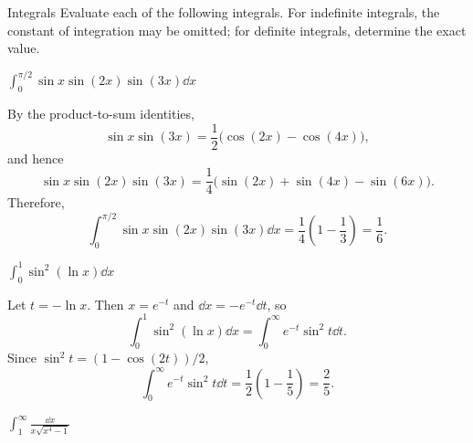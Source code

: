     \begin{expectedproblemgroup}{Integrals}
        Evaluate each of the following integrals. For indefinite integrals, the
        constant of integration may be omitted; for definite integrals,
        determine the exact value.

        \begin{expectedsubproblem}
            \(\displaystyle
                \int_0^{\pi/2}\sin x\sin(2x)\sin(3x)\dd x
            \)
        \end{expectedsubproblem}

        \begin{expectedsubsolution}
            By the product-to-sum identities,
            \[
                \sin x\sin(3x)
                =
                \frac{1}{2}\bigl(\cos(2x)-\cos(4x)\bigr),
            \]
            and hence
            \[
                \sin x\sin(2x)\sin(3x)
                =
                \frac{1}{4}
                \bigl(\sin(2x)+\sin(4x)-\sin(6x)\bigr).
            \]
            Therefore,
            \[
                \int_0^{\pi/2}\sin x\sin(2x)\sin(3x)\dd x
                =
                \frac{1}{4}\left(1-\frac{1}{3}\right)
                =
                \boxed{\frac{1}{6}}.
            \]
        \end{expectedsubsolution}

        \begin{expectedsubproblem}
            \(\displaystyle
                \int_0^1\sin^2(\ln x)\dd x
            \)
        \end{expectedsubproblem}

        \begin{expectedsubsolution}
            Let $t=-\ln x$. Then $x=e^{-t}$ and
            $\dd x=-e^{-t}\dd t$, so
            \[
                \int_0^1\sin^2(\ln x)\dd x
                =
                \int_0^\infty e^{-t}\sin^2t\dd t.
            \]
            Since $\sin^2t=(1-\cos(2t))/2$,
            \[
                \int_0^\infty e^{-t}\sin^2t\dd t
                =
                \frac{1}{2}
                \left(1-\frac{1}{5}\right)
                =
                \boxed{\frac{2}{5}}.
            \]
        \end{expectedsubsolution}

        \begin{expectedsubproblem}
            \(\displaystyle
                \int_1^\infty\frac{\dd x}{x\sqrt{x^4-1}}
            \)
        \end{expectedsubproblem}


\end{expectedproblemgroup}
